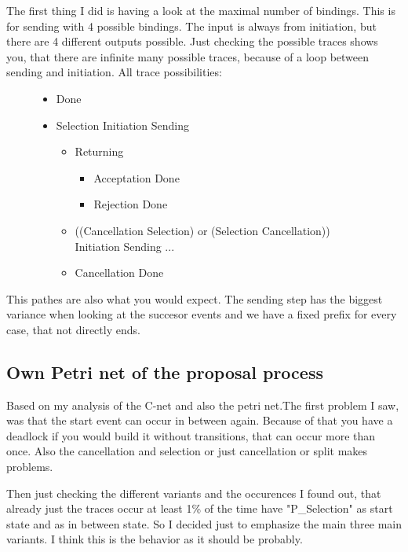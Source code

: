 The first thing I did is having a look at the maximal number of bindings. This is for sending with 4 possible bindings. The input is always from initiation, but there are 4 different outputs possible.  Just checking the possible traces shows you, that there are infinite many possible traces, because of a loop between sending and initiation. All trace possibilities:
\begin{figure}[!htbp]
\begin{itemize}
	\item Done
	\item Selection \textrightarrow Initiation \textrightarrow Sending \textrightarrow
	\begin{itemize}
	\item  Returning \textrightarrow
	\begin{itemize}
		\item Acceptation \textrightarrow Done
		\item Rejection \textrightarrow Done
	\end{itemize}
	\item ((Cancellation \textrightarrow Selection) or (Selection \textrightarrow Cancellation)) \textrightarrow Initiation \textrightarrow Sending ...
	\item Cancellation \textrightarrow Done
	\end{itemize}
\end{itemize}
\end{figure}

This pathes are also what you would expect. The sending step has the biggest variance when looking at the succesor events and we have a fixed prefix for every case, that not directly ends.


\subsection{Own Petri net of the proposal process}
Based on my analysis of the C-net and also the petri net.The first problem I saw, was that the start event can occur in between again. Because of that you have a deadlock if you would build it without transitions, that can occur more than once. Also the cancellation and selection or just cancellation or split makes problems. 

Then just checking the different variants and the occurences I found out, that already just the traces occur at least 1\% of the time have "P\_Selection" as start state and as in between state. So I decided just to emphasize the main three main variants. I think this is the behavior as it should be probably.

